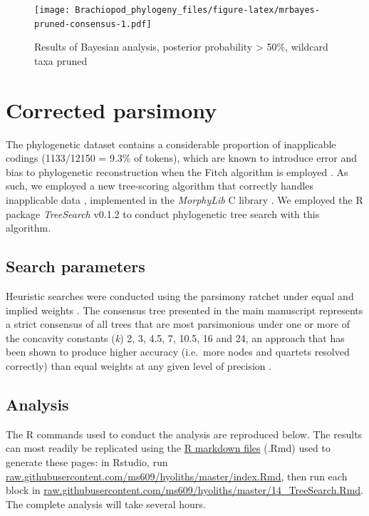 \documentclass[openany]{book}
\begin{document}
\begin{figure}
\centering
\texttt{[image: Brachiopod\_phylogeny\_files/figure-latex/mrbayes-pruned-consensus-1.pdf]}
\caption{\label{fig:mrbayes-pruned-consensus}Results of Bayesian analysis,
posterior probability \textgreater{} 50\%, wildcard taxa pruned}
\end{figure}

\hypertarget{treesearch}{\chapter{Corrected
parsimony}\label{treesearch}}

The phylogenetic dataset contains a considerable proportion of
inapplicable codings (1133/12150 = 9.3\% of tokens), which are known to
introduce error and bias to phylogenetic reconstruction when the Fitch
algorithm is employed \citep{Maddison1993, Brazeau2018}. As such, we
employed a new tree-scoring algorithm that correctly handles
inapplicable data \citep{Brazeau2018}, implemented in the
\emph{MorphyLib} C library \citep{Brazeau2017Morphylib}. We employed the
R package \emph{TreeSearch} v0.1.2 \citep{Smith2018TreeSearch} to
conduct phylogenetic tree search with this algorithm.

\section{Search parameters}\label{search-parameters}

Heuristic searches were conducted using the parsimony ratchet
\citep{Nixon1999} under equal and implied weights \citep{Goloboff1997}.
The consensus tree presented in the main manuscript represents a strict
consensus of all trees that are most parsimonious under one or more of
the concavity constants (\emph{k}) 2, 3, 4.5, 7, 10.5, 16 and 24, an
approach that has been shown to produce higher accuracy (i.e.~more nodes
and quartets resolved correctly) than equal weights at any given level
of precision \citep{Smith2017}.

\section{Analysis}\label{analysis}

The R commands used to conduct the analysis are reproduced below. The
results can most readily be replicated using the
\href{https://github.com/ms609/hyoliths/}{R markdown files} (.Rmd) used
to generate these pages: in Rstudio, run
\href{https://raw.githubusercontent.com/ms609/hyoliths/master/index.Rmd}{raw.githubusercontent.com/ms609/hyoliths/master/index.Rmd},
then run each block in
\href{https://raw.githubusercontent.com/ms609/hyoliths/master/14_TreeSearch.Rmd}{raw.githubusercontent.com/ms609/hyoliths/master/14\_TreeSearch.Rmd}.
The complete analysis will take several hours.
\end{document}
